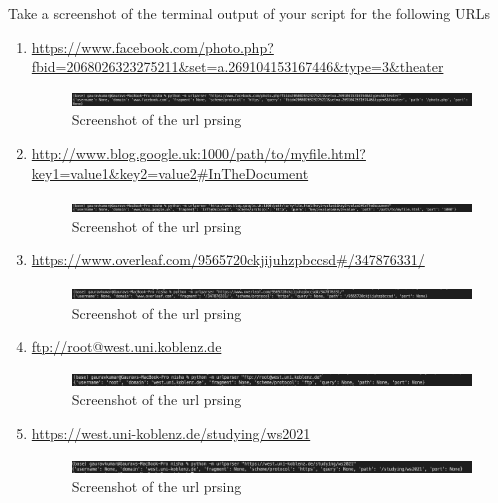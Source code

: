 \documentclass{resources/WeSTassignment}
\begin{document}
\begin{enumerate}
Take a screenshot of the terminal output of your script for the following URLs
\begin{enumerate}
    \item \url{https://www.facebook.com/photo.php?fbid=2068026323275211&set=a.269104153167446&type=3&theater}
\begin{figure}[h!]
  \includegraphics[width=\linewidth]{resources/facebook_urlparser.png}
  \caption{Screenshot of the url prsing}
  \label{Screenshot of the url parsing}
  \end{figure}
    \item \url{http://www.blog.google.uk:1000/path/to/myfile.html?key1=value1&key2=value2#InTheDocument}
\begin{figure}[h!]
  \includegraphics[width=\linewidth]{resources/blog_google_urlparser.png}
  \caption{Screenshot of the url prsing}
  \label{Screenshot of the url parsing}
  \end{figure}
    \item \url{https://www.overleaf.com/9565720ckjijuhzpbccsd#/347876331/}
    \begin{figure}[h!]
  \includegraphics[width=\linewidth]{resources/overleaf_urlparser.png}
  \caption{Screenshot of the url prsing}
  \label{Screenshot of the url parsing}
  \end{figure}
    \item \url{ftp://root@west.uni.koblenz.de}
    \begin{figure}[h!]
  \includegraphics[width=\linewidth]{resources/root_urlparser.png}
  \caption{Screenshot of the url prsing}
  \label{Screenshot of the url parsing}
  \end{figure}
    \item \url{https://west.uni-koblenz.de/studying/ws2021}
    \begin{figure}[h!]
  \includegraphics[width=\linewidth]{resources/unikoblenz_urlparser.png}
  \caption{Screenshot of the url prsing}
  \label{Screenshot of the url parsing}
  \end{figure}
    

\end{enumerate}
\end{enumerate}
\end{document}
